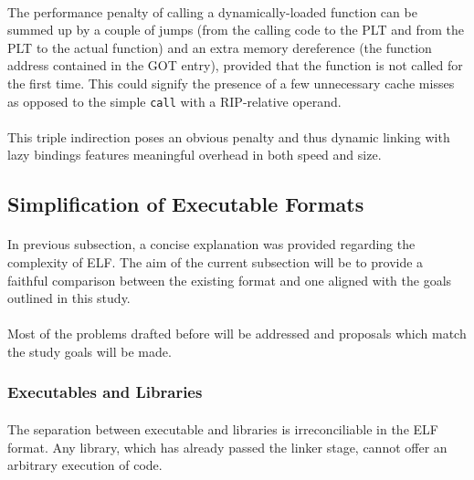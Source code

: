 \documentclass[12pt]{article}
\begin{document}
	\paragraph{}The performance penalty of calling a dynamically-loaded function can be summed up by a couple of jumps (from the calling code to the \acrshort{PLT} and from the \acrshort{PLT} to the actual function) and an extra memory dereference (the function address contained in the \acrshort{GOT} entry), provided that the function is not called for the first time. This could signify the presence of a few unnecessary cache misses as opposed to the simple \verb|call| with a \gls{RIP}-relative operand.
	\paragraph{}This triple indirection poses an obvious penalty and thus dynamic linking with lazy bindings features meaningful overhead in both speed and size.
	
	\subsection{Simplification of Executable Formats}
	\paragraph{}In previous subsection, a concise explanation was provided regarding the complexity of \acrshort{ELF}. The aim of the current subsection will be to provide a faithful comparison between the existing format and one aligned with the goals outlined in this study.
	\paragraph{}Most of the problems drafted before will be addressed and proposals which match the study goals will be made.
	
	\subsubsection{Executables and Libraries}
	
	\paragraph{}The separation between executable and libraries is irreconciliable in the \acrshort{ELF} format. Any library, which has already passed the linker stage, cannot offer an arbitrary execution of code.
\end{document}
